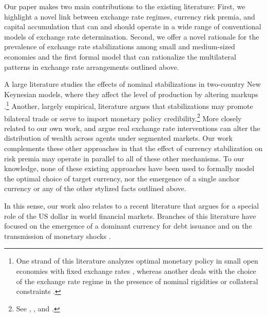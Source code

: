 \documentclass[12pt,letter]{article}
\theoremstyle{break} \theorembodyfont{\normalfont\itshape}
\theoremstyle{break}
\theoremstyle{break} \theorembodyfont{\normalfont\itshape}
\theoremstyle{break} \theorembodyfont{\normalfont\itshape}
\begin{document}
\bigskip

Our paper makes two main contributions to the existing literature:
First, we highlight a novel link between exchange rate regimes,
currency risk premia, and capital accumulation that can and should
operate in a wide range of conventional models of exchange rate
determination. Second, we offer a novel rationale for the prevalence
of exchange rate stabilizations among small and medium-sized economies
and the first formal model that can rationalize the multilateral
patterns in exchange rate arrangements outlined above.

A large literature studies the effects of nominal stabilizations in
two-country New Keynesian models, where they affect the level of
production by altering markups \citep[e.g.,][]{Kollmann2002,
  DevereuxEngel2003,Fornaro2015}.\footnote{One strand of this
  literature analyzes optimal monetary policy in small open economies
  with fixed exchange rates \citep*{Kollmann2002, ParradoVelasco2002,
    GaliMonacelli2005, Auclert2014}, whereas another deals with the
  choice of the exchange rate regime in the presence of nominal
  rigidities \citep*{HelpmanRazin1987, BacchettavanWincoop2000,
    CorsettiDedolaLeduc2010, Schmitt-GroheUribe2012,
    BerginCorsetti2015} or collateral constraints
  \citep{Ottonello2015, Fornaro2015}.} Another, largely empirical,
literature argues that stabilizations may promote bilateral trade or
serve to import monetary policy credibility.\footnote{See
  \cite{Hooper1978}, \cite{Kenen1986}, and \cite{Frankel2002}.} More
closely related to our own work, \citet*{Fanelli2019} and
\cite{GabaixMaggiori2015} argue real exchange rate interventions can
alter the distribution of wealth across agents under segmented
markets. Our work complements these other approaches in that the
effect of currency stabilization on risk premia may operate in
parallel to all of these other mechanisms. To our knowledge, none of
these existing approaches have been used to formally model the optimal
choice of target currency, nor the emergence of a single anchor
currency or any of the other stylized facts outlined above.




In this sense, our work also relates to a recent literature that
argues for a special role of the US dollar in world financial markets.
Branches of this literature have focused on the emergence of a
dominant currency for debt issuance \citep*{ChahrourValchev2019,
  FarhiMaggiori2017, He2019, GopinathStein2019} and on the
transmission of monetary shocks \citep{Boz2019,
  Miranda-AgrippinoRey2015, Zhang2019}.
\end{document}
